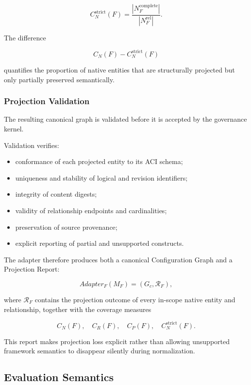 \documentclass[10pt]{article}
\begin{document}
\[
C_N^{\mathrm{strict}}(F)
=
\frac{
	|N_F^{\mathrm{complete}}|
}{
	|N_F^{\mathrm{rel}}|
}.
\tag{49}
\]

The difference

\[
C_N(F)-C_N^{\mathrm{strict}}(F)
\]

quantifies the proportion of native entities that are structurally projected
but only partially preserved semantically.

\subsubsection{Projection Validation}

The resulting canonical graph is validated before it is accepted by the
governance kernel.

Validation verifies:

\begin{itemize}
	\item conformance of each projected entity to its ACI schema;
	\item uniqueness and stability of logical and revision identifiers;
	\item integrity of content digests;
	\item validity of relationship endpoints and cardinalities;
	\item preservation of source provenance;
	\item explicit reporting of partial and unsupported constructs.
\end{itemize}

The adapter therefore produces both a canonical Configuration Graph and a
Projection Report:

\[
Adapter_F(M_F)
=
(G_c,\mathcal{R}_F),
\tag{50}
\]

where $\mathcal{R}_F$ contains the projection outcome of every in-scope native
entity and relationship, together with the coverage measures

\[
C_N(F),\quad
C_R(F),\quad
C_P(F),\quad
C_N^{\mathrm{strict}}(F).
\]

This report makes projection loss explicit rather than allowing unsupported
framework semantics to disappear silently during normalization.

\subsection{Evaluation Semantics}
\label{appendix:evaluation_semantics}
\end{document}
